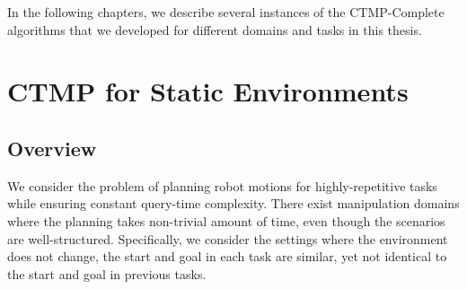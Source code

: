 \documentclass[a4paper]{report}
\begin{document}

%
%
In the following chapters, we describe several instances of the CTMP-Complete algorithms that we developed for different domains and tasks in this thesis.

\newpage
\chapter{CTMP for Static Environments}
\label{chap:icaps}
\section{Overview}
We consider the problem of planning robot motions for highly-repetitive tasks while ensuring constant query-time complexity. There exist manipulation domains where the planning takes non-trivial amount of time, even though the scenarios are well-structured. Specifically, we consider the settings where the environment does not change, the start and goal in each task are similar, yet not identical to the start and goal in previous tasks.
\end{document}
